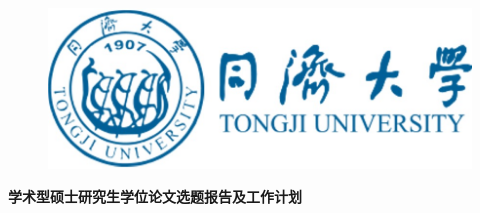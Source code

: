 \begin{figure}[htbp]
    \centering
    \includegraphics[scale=0.4]{figure/tongji_logo.jpg}

\end{figure}

\vskip 0.6cm
\begin{center}
    \textbf{\heiti\LARGE %
    学术型硕士研究生学位论文选题报告及工作计划 }
\end{center}

\vskip 3cm





